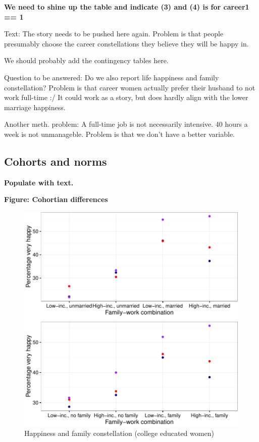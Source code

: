 \documentclass[]{article}
\begin{document}
\textbf{We need to shine up the table and indicate (3) and (4) is for
career1 == 1}

Text: The story needs to be pushed here again. Problem is that people
presumably choose the career constellations they believe they will be
happy in.

We should probably add the contingency tables here.

Question to be answered: Do we also report life happiness and family
constellation? Problem is that career women actually prefer their
husband to not work full-time :/ It could work as a story, but does
hardly align with the lower marriage happiness.

Another meth. problem: A full-time job is not necessarily intensive. 40
hours a week is not unmanageble. Problem is that we don't have a better
variable.

\subsection{Cohorts and norms}\label{cohorts-and-norms}

\textbf{Populate with text.}

\textbf{Figure: Cohortian differences}

\begin{figure}[htbp]
\centering
\includegraphics{Final_Project_P-P_analysis_Unger_files/figure-latex/unnamed-chunk-16-1.pdf}
\caption{Happiness and family constellation (college educated women)}
\end{figure}
\end{document}
